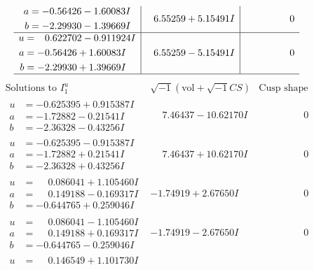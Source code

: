 \documentclass[1p]{elsarticle_modified}
\theoremstyle{definition}
\newcommand{\I}{\sqrt{-1}}
\begin{document}
$$\begin{array}{c|c|c}
\begin{aligned}
a &= -0.56426 - 1.60083 I \\
b &= -2.29930 - 1.39669 I\end{aligned}
 & \phantom{-}6.55259 + 5.15491 I & \phantom{-0.000000 } 0 \\ \hline\begin{aligned}
u &= \phantom{-}0.622702 - 0.911924 I \\
a &= -0.56426 + 1.60083 I \\
b &= -2.29930 + 1.39669 I\end{aligned}
 & \phantom{-}6.55259 - 5.15491 I & \phantom{-0.000000 } 0\\
 \hline 
 \end{array}$$\newpage$$\begin{array}{c|c|c}  
\text{Solutions to }I^u_{1}& \I (\text{vol} + \sqrt{-1}CS) & \text{Cusp shape}\\
 \hline 
\begin{aligned}
u &= -0.625395 + 0.915387 I \\
a &= -1.72882 - 0.21541 I \\
b &= -2.36328 - 0.43256 I\end{aligned}
 & \phantom{-}7.46437 - 10.62170 I & \phantom{-0.000000 } 0 \\ \hline\begin{aligned}
u &= -0.625395 - 0.915387 I \\
a &= -1.72882 + 0.21541 I \\
b &= -2.36328 + 0.43256 I\end{aligned}
 & \phantom{-}7.46437 + 10.62170 I & \phantom{-0.000000 } 0 \\ \hline\begin{aligned}
u &= \phantom{-}0.086041 + 1.105460 I \\
a &= \phantom{-}0.149188 - 0.169317 I \\
b &= -0.644765 + 0.259046 I\end{aligned}
 & -1.74919 + 2.67650 I & \phantom{-0.000000 } 0 \\ \hline\begin{aligned}
u &= \phantom{-}0.086041 - 1.105460 I \\
a &= \phantom{-}0.149188 + 0.169317 I \\
b &= -0.644765 - 0.259046 I\end{aligned}
 & -1.74919 - 2.67650 I & \phantom{-0.000000 } 0 \\ \hline\begin{aligned}
u &= \phantom{-}0.146549 + 1.101730 I \\

\end{aligned}
\end{array}$$
\end{document}
